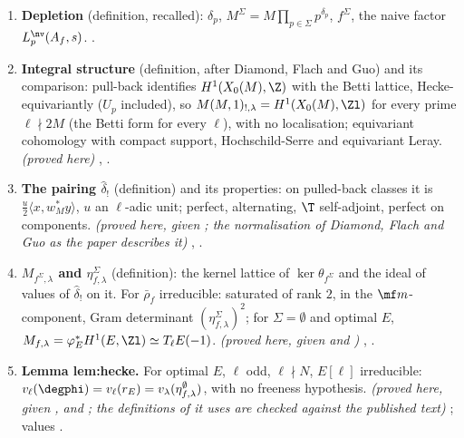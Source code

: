 \begin{enumerate}[label=\textbf{\thechapter.\arabic*}]
$d\,v(\eta)\ge v(\Delta)$, with equality if $L$ is free over $\T$. \emph{(proved here, given )} ; Commentary on the paper's statement
; hypotheses ; test cases .
\item \textbf{Depletion} (definition, recalled): $\delta_p$, $M^\Sigma=M\prod_{p\in\Sigma}p^{\delta_p}$, $f^\Sigma$, the naive factor $L^{\nv}_p(A_f,s)$. .
\item \textbf{Integral structure} (definition, after Diamond, Flach and Guo) and its comparison: pull-back identifies $H^1(X_0(M),\Z)$ with the Betti lattice, Hecke-equivariantly ($U_p$ included), so
$M(M,1)_{!,\lambda}=H^1(X_0(M),\Zl)$ for every prime $\ell\nmid2M$ (the Betti form for every $\ell$), with no localisation; equivariant cohomology with compact support, Hochschild-Serre and equivariant Leray. \emph{(proved here)}
, .
\item \textbf{The pairing $\hat\delta_!$} (definition) and its properties: on pulled-back classes it is $\frac u2\langle x,w_M^*y\rangle$, $u$ an $\ell$-adic unit; perfect, alternating, $\T$ self-adjoint, perfect on components. \emph{(proved here, given
; the normalisation of Diamond, Flach and Guo as the paper describes it)} , .
\item \textbf{$M_{f^\Sigma,\lambda}$ and $\eta^\Sigma_{f,\lambda}$} (definition): the kernel lattice of $\ker\theta_{f^\Sigma}$ and the ideal of values of $\hat\delta_!$ on it. For $\bar\rho_f$ irreducible: saturated of rank $2$, in the
$\mf m$-component, Gram determinant $(\eta^\Sigma_{f,\lambda})^2$; for $\Sigma=\emptyset$ and optimal $E$, $M_{f,\lambda}=\varphi_E^*H^1(E,\Zl)\simeq T_\ell E(-1)$. \emph{(proved here, given  and
)} , .
\item \textbf{Lemma lem:hecke.} For optimal $E$, $\ell$ odd, $\ell\nmid N$, $E[\ell]$ irreducible: $v_\ell(\degphi)=v_\ell(r_E)=v_\lambda(\eta^\emptyset_{f,\lambda})$, with no freeness hypothesis. \emph{(proved here, given
\cite[Theorem 2.2]{ARS12},  and ; the definitions of \cite{DFG04} it uses are checked against the published text)}
; values .

\end{enumerate}
